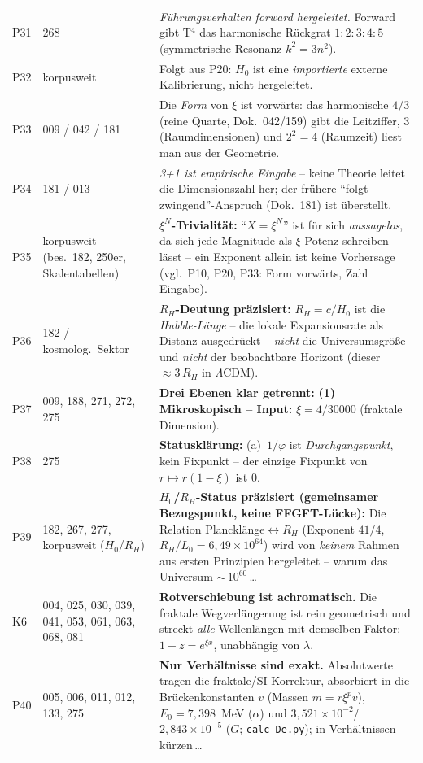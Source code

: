 \begin{longtable}{@{}p{0.9cm}p{3.1cm}p{10.2cm}@{}}
P31 & 268 & \emph{Führungsverhalten forward hergeleitet.} Forward gibt T$^4$ das harmonische Rückgrat $1:2:3:4:5$ (symmetrische Resonanz $k^2=3n^2$). \\
P32 & korpusweit & Folgt aus P20: $H_0$ ist eine \emph{importierte} externe Kalibrierung, nicht hergeleitet. \\
P33 & 009 / 042 / 181 & Die \emph{Form} von $\xi$ ist vorwärts: das harmonische $4/3$ (reine Quarte, Dok.~042/159) gibt die Leitziffer, $3$ (Raumdimensionen) und $2^2{=}4$ (Raumzeit) liest man aus der Geometrie. \\
P34 & 181 / 013 & \emph{3+1 ist empirische Eingabe} -- keine Theorie leitet die Dimensionszahl her; der frühere \enquote{folgt zwingend}-Anspruch (Dok.~181) ist überstellt. \\
P35 & korpusweit (bes.\ 182, 250er, Skalentabellen) & \textbf{$\xi^N$-Trivialität:} \enquote{$X = \xi^N$} ist für sich \emph{aussagelos}, da sich jede Magnitude als $\xi$-Potenz schreiben lässt -- ein Exponent allein ist keine Vorhersage (vgl.\ P10, P20, P33: Form vorwärts, Zahl Eingabe). \\
P36 & 182 / kosmolog.\ Sektor & \textbf{$R_H$-Deutung präzisiert:} $R_H = c/H_0$ ist die \emph{Hubble-Länge} -- die lokale Expansionsrate als Distanz ausgedrückt -- \emph{nicht} die Universumsgröße und \emph{nicht} der beobachtbare Horizont (dieser $\approx 3\,R_H$ in $\Lambda$CDM). \\
P37 & 009, 188, 271, 272, 275 & \textbf{Drei Ebenen klar getrennt:} \newline \textbf{(1) Mikroskopisch -- Input:} $\xi = 4/30000$ (fraktale Dimension). \\
P38 & 275 & \textbf{Statusklärung:} (a)~$1/\varphi$ ist \emph{Durchgangspunkt}, kein Fixpunkt -- der einzige Fixpunkt von $r\mapsto r(1-\xi)$ ist $0$. \\
P39 & 182, 267, 277, korpusweit ($H_0$/$R_H$) & \textbf{$H_0$/$R_H$-Status präzisiert (gemeinsamer Bezugspunkt, keine FFGFT-Lücke):} Die Relation Plancklänge$\leftrightarrow R_H$ (Exponent $41/4$, $R_H/L_0 = 6{,}49\times10^{64}$) wird von \emph{keinem} Rahmen aus ersten Prinzipien hergeleitet -- warum das Universum $\sim$\,$10^{60}$\,\ldots \\
K6 & 004, 025, 030, 039, 041, 053, 061, 063, 068, 081 & \textbf{Rotverschiebung ist achromatisch.} Die fraktale Wegverlängerung ist rein geometrisch und streckt \emph{alle} Wellenlängen mit demselben Faktor: $1+z=e^{\xi x}$, unabhängig von $\lambda$. \\
P40 & 005, 006, 011, 012, 133, 275 & \textbf{Nur Verhältnisse sind exakt.} Absolutwerte tragen die fraktale/SI-Korrektur, absorbiert in die Brückenkonstanten $v$ (Massen $m=r\xi^p v$), $E_0=7{,}398$~MeV ($\alpha$) und $3{,}521\times10^{-2}$/$2{,}843\times10^{-5}$ ($G$; \texttt{calc\_De.py}); in Verhältnissen kürzen\,\ldots \\

\end{longtable}

